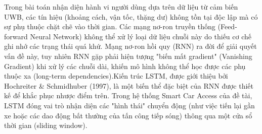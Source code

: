 Trong bài toán nhận diện hành vi người dùng dựa trên dữ liệu từ cảm biến UWB, các tín hiệu (khoảng cách, vận tốc, thặng dư) không tồn tại độc lập mà có sự phụ thuộc chặt chẽ vào thời gian. Các mạng nơ-ron truyền thống (Feed-forward Neural Network) không thể xử lý loại dữ liệu chuỗi này do thiếu cơ chế ghi nhớ các trạng thái quá khứ. Mạng nơ-ron hồi quy (RNN) ra đời để giải quyết vấn đề này, tuy nhiên RNN gặp phải hiện tượng "biến mất gradient" (Vanishing Gradient) khi xử lý các chuỗi dài, khiến mô hình không thể học được các phụ thuộc xa (long-term dependencies).Kiến trúc LSTM, được giới thiệu bởi Hochreiter \& Schmidhuber (1997), là một biến thể đặc biệt của RNN được thiết kế để khắc phục nhược điểm trên. Trong hệ thống Smart Car Access của đề tài, LSTM đóng vai trò nhận diện các "hình thái" chuyển động (như việc tiến lại gần xe hoặc các dao động bất thường của tấn công tiếp sóng) thông qua một cửa sổ thời gian (sliding window).


